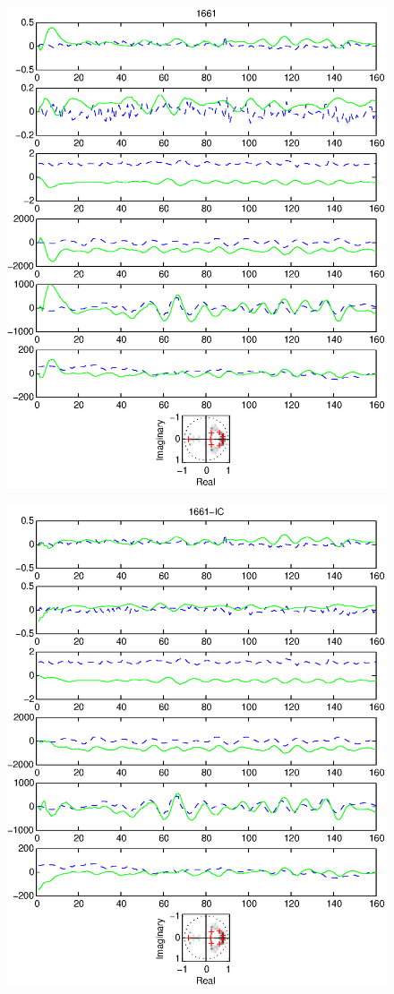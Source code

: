 \documentclass{article}
\begin{document}
\begin{figure}[htb!]
\centering
\includegraphics{1661.eps}
\end{figure}\clearpage
\begin{figure}[htb!]
\centering
\includegraphics{1661_ic.eps}
\end{figure}\clearpage
\end{document}
